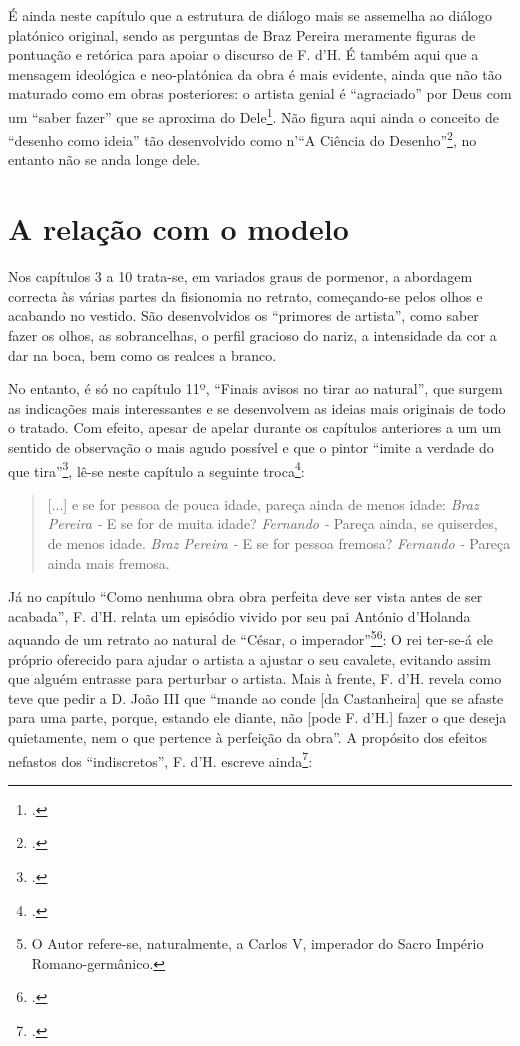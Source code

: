 \documentclass{article}
\begin{document}
É ainda neste capítulo que a estrutura de diálogo mais se assemelha ao
diálogo platónico original, sendo as perguntas de Braz Pereira
meramente figuras de pontuação e retórica para apoiar o discurso de
F. d'H. É também aqui que a mensagem ideológica e neo-platónica da
obra é mais evidente, ainda que não tão maturado como em obras
posteriores: o artista genial é ``agraciado'' por Deus com um ``saber
fazer'' que se aproxima do Dele\footcite[p.14]{holanda}. Não figura aqui
ainda o conceito de ``desenho como ideia'' tão desenvolvido como n'``A
Ciência do Desenho''\footcite{holanda-desenho}, no entanto não se anda
longe dele.

\section{A relação com o modelo}

Nos capítulos 3 a 10 trata-se, em variados graus de pormenor, a
abordagem correcta às várias partes da fisionomia no retrato,
começando-se pelos olhos e acabando no vestido. São desenvolvidos os
``primores de artista'', como saber fazer os olhos, as sobrancelhas, o
perfil gracioso do nariz, a intensidade da cor a dar na boca, bem como
os realces a branco.

No entanto, é só no capítulo 11º, ``Finais avisos no tirar ao
natural'', que surgem as indicações mais interessantes e se
desenvolvem as ideias mais originais de todo o tratado. Com efeito,
apesar de apelar durante os capítulos anteriores a um um sentido de
observação o mais agudo possível e que o pintor ``imite a verdade do
que tira''\footcite[p.31]{holanda}, lê-se neste capítulo a seguinte
troca\footcite[p.39]{holanda}:

\begin{quote}
  [...] e se for pessoa de pouca idade, pareça ainda de menos idade:
  \emph{Braz Pereira -}  E se for de muita idade?
  \emph{Fernando -}  Pareça ainda, se quiserdes, de menos idade.
  \emph{Braz Pereira -}  E se for pessoa fremosa?
  \emph{Fernando -}  Pareça ainda mais fremosa.
\end{quote}

Já no capítulo ``Como nenhuma obra obra perfeita deve ser vista antes
de ser acabada'', F. d'H. relata um episódio vivido por seu pai
António d'Holanda aquando de um retrato ao natural de ``César, o
imperador''\footnote{O Autor refere-se, naturalmente, a Carlos V,
  imperador do Sacro Império Romano-germânico.}\footcite[p.17]{holanda}: O
rei ter-se-á ele próprio oferecido para ajudar o artista a ajustar o
seu cavalete, evitando assim que alguém entrasse para perturbar o
artista. Mais à frente, F. d'H. revela como teve que pedir a D. João
III que ``mande ao conde [da Castanheira] que se afaste para uma
parte, porque, estando ele diante, não [pode F. d'H.] fazer o que
deseja quietamente, nem o que pertence à perfeição da obra''. A
propósito dos efeitos nefastos dos ``indiscretos'', F. d'H. escreve
ainda\footcite[p.18]{holanda}:
\end{document}
